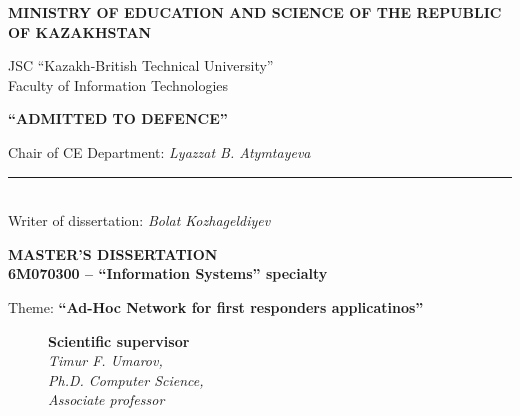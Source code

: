 \begin{titlepage}
    \pagestyle{empty}
    \begin{center}
        {\bf{\MakeUppercase{Ministry of education and science of the republic of Kazakhstan}}

        \vspace{14pt}

        JSC ``Kazakh-British Technical University''\\
        Faculty of Information Technologies}
       
       \vspace{14pt}
       
        \begin{flushright}
            {\bf \MakeUppercase{``Admitted to defence''}}

            Chair of CE Department: {\em Lyazzat B. Atymtayeva}\\
            \vspace{0.5\baselineskip}
            \rule{13em}{0.4pt}\\
            \vspace{14pt}
          Writer of dissertation: {\em Bolat Kozhageldiyev}
          \vspace{14pt}
        \end{flushright}
        
        {\bf
        \MakeUppercase{Master's Dissertation}\\
        6M070300 -- ``Information Systems'' specialty}

        \vspace{14pt}

        Theme: {\bf ``Ad-Hoc Network for first responders applicatinos''}
        
        \vspace{28pt}
        
        \begin{figure}[ht]
            \begin{minipage}[t]{0.6\linewidth}
                {\bf Scientific supervisor}\\

                {\em Timur F. Umarov,\\
                Ph.D. Computer Science,\\
                Associate professor}\\
            \end{minipage}
        \end{figure}


\end{center}
\end{titlepage}
